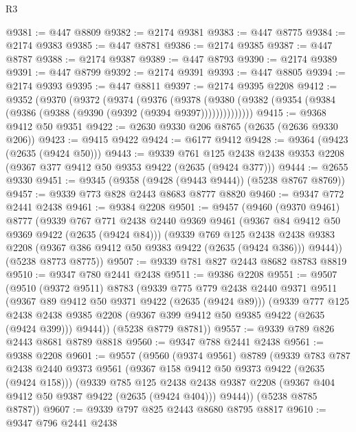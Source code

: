\begin{lexlean}{R3}
\begin{coremodule}
@9381 := @447 @8809
@9382 := @2174 @9381
@9383 := @447 @8775
@9384 := @2174 @9383
@9385 := @447 @8781
@9386 := @2174 @9385
@9387 := @447 @8787
@9388 := @2174 @9387
@9389 := @447 @8793
@9390 := @2174 @9389
@9391 := @447 @8799
@9392 := @2174 @9391
@9393 := @447 @8805
@9394 := @2174 @9393
@9395 := @447 @8811
@9397 := @2174 @9395 @2208
@9412 := @9352
    (@9370
      (@9372
        (@9374
          (@9376
            (@9378
              (@9380 (@9382 (@9354 (@9384 (@9386 (@9388 (@9390 (@9392 (@9394 @9397))))))))))))))
@9415 := @9368 @9412 @50 @9351
@9422 := @2630 @9330 @206 @8765 (@2635 (@2636 @9330 @206))
@9423 := @9415 @9422
@9424 := @6177 @9412
@9428 := @9364 (@9423 (@2635 (@9424 @50)))
@9443 := @9339
    @761
    @125
    @2438
    @2438
    @9353
    @2208
    (@9367 @377 @9412 @50 @9353 @9422 (@2635 (@9424 @377)))
@9444 := @2655 @9330
@9451 := @9345 (@9358 (@9428 (@9443 @9444)) (@5238 @8767 @8769))
@9457 := @9339 @773 @828 @2443 @8683 @8777 @8820
@9460 := @9347 @772 @2441 @2438
@9461 := @9384 @2208
@9501 := @9457
    (@9460
      (@9370 @9461)
      @8777
      (@9339
        @767
        @771
        @2438
        @2440
        @9369
        @9461
        (@9367 @84 @9412 @50 @9369 @9422 (@2635 (@9424 @84)))
        (@9339
          @769
          @125
          @2438
          @2438
          @9383
          @2208
          (@9367 @386 @9412 @50 @9383 @9422 (@2635 (@9424 @386)))
          @9444))
      (@5238 @8773 @8775))
@9507 := @9339 @781 @827 @2443 @8682 @8783 @8819
@9510 := @9347 @780 @2441 @2438
@9511 := @9386 @2208
@9551 := @9507
    (@9510
      (@9372 @9511)
      @8783
      (@9339
        @775
        @779
        @2438
        @2440
        @9371
        @9511
        (@9367 @89 @9412 @50 @9371 @9422 (@2635 (@9424 @89)))
        (@9339
          @777
          @125
          @2438
          @2438
          @9385
          @2208
          (@9367 @399 @9412 @50 @9385 @9422 (@2635 (@9424 @399)))
          @9444))
      (@5238 @8779 @8781))
@9557 := @9339 @789 @826 @2443 @8681 @8789 @8818
@9560 := @9347 @788 @2441 @2438
@9561 := @9388 @2208
@9601 := @9557
    (@9560
      (@9374 @9561)
      @8789
      (@9339
        @783
        @787
        @2438
        @2440
        @9373
        @9561
        (@9367 @158 @9412 @50 @9373 @9422 (@2635 (@9424 @158)))
        (@9339
          @785
          @125
          @2438
          @2438
          @9387
          @2208
          (@9367 @404 @9412 @50 @9387 @9422 (@2635 (@9424 @404)))
          @9444))
      (@5238 @8785 @8787))
@9607 := @9339 @797 @825 @2443 @8680 @8795 @8817
@9610 := @9347 @796 @2441 @2438

\end{coremodule}
\end{lexlean}
